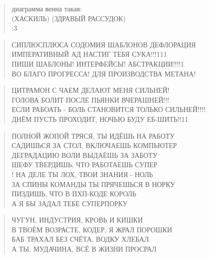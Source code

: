 \poemtitle{***}
\begin{verse}
диаграмма венна такая:\\
(ХАСКИЛЬ)      (ЗДРАВЫЙ РАССУДОК)\\
:3
\end{verse}

\poemtitle{***}
\begin{verse}
СИПЛЮСПЛЮСА СОДОМИЯ ШАБЛОНОВ ДЕФЛОРАЦИЯ\\
ИМПЕРАТИВНЫЙ АД НАСТИГ ТЕБЯ СУКА!!!111\\
ПИШИ ШАБЛОНЫ! ИНТЕРФЕЙСЫ! АБСТРАКЦИИ!!!!1\\
ВО БЛАГО ПРОГРЕССА! ДЛЯ ПРОИЗВОДСТВА МЕТАНА!
\end{verse}

\poemtitle{***}
\begin{verse}
ЦИТРАМОН С ЧАЕМ ДЕЛАЮТ МЕНЯ СИЛЬНЕЙ!\\
ГОЛОВА БОЛИТ ПОСЛЕ ПЬЯНКИ ВЧЕРАШНЕЙ!!!\\
ЕСЛИ РАБОАТЬ - БОЛЬ СТАНОВИТСЯ ТОЛЬКО СИЛЬНЕЙ!!!!\\
ДНЁМ ПУСТЬ ПРОХОДИТ, НОЧЬЮ БУДУ ЕБ-ШИТЬ!!11
\end{verse}

\poemtitle{***}
\begin{verse}
ПОЛНОЙ ЖОПОЙ ТРЯСЯ, ТЫ ИДЁШЬ НА РАБОТУ\\
САДИШЬСЯ ЗА СТОЛ, ВКЛЮЧАЕШЬ КОМПЬЮТЕР\\
ДЕГРАДАЦИЮ ВОЛИ ВЫДАЁШЬ ЗА ЗАБОТУ\\
ШЕФУ ТВЕРДИШЬ, ЧТО РАБОТАЕШЬ СУПЕР\\!
НА ДЕЛЕ ТЫ ЛОХ, ТВОИ ЗНАНИЯ - НОЛЬ\\
ЗА СПИНЫ КОМАНДЫ ТЫ ПРЯЧЕШЬСЯ В НОРКУ\\
ПИЗДИШЬ, ЧТО В ПХП-КОДЕ КОРОЛЬ\\
А Я БЫ ЗАДАЛ ТЕБЕ СУПЕРПОРКУ
\end{verse}

\poemtitle{***}
\begin{verse}
ЧУГУН, ИНДУСТРИЯ, КРОВЬ И КИШКИ\\
В ТВОЁМ ВОЗРАСТЕ, КОДЕР, Я ЖРАЛ ПОРОШКИ\\
БАБ ТРАХАЛ БЕЗ СЧЁТА, ВОДКУ ХЛЕБАЛ\\
А ТЫ, МУДАЧИНА, ВСЁ В ЖИЗНИ ПРОСРАЛ
\end{verse}

